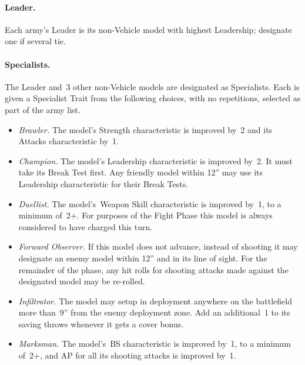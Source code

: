 
  \paragraph{Leader.} Each army's Leader is its non-Vehicle model with
  highest Leadership; designate one if several tie.

  \paragraph{Specialists.}  The Leader and~3 other non-Vehicle models
  are designated as Specialists.  Each is given a Specialist Trait
  from the following choices, with no repetitions, selected as part of
  the army list.

  \begin{itemize}\shortlist
  \item \emph{Brawler.} The model's Strength characteristic is
    improved by~2 and its Attacks characteristic by~1.

  \item \emph{Champion.} The model's Leadership characteristic is
    improved by~2.  It must take its Break Test first.  Any friendly
    model within 12'' may use its Leadership characteristic for their
    Break Tests.
    
  \item \emph{Duellist.} The model's~Weapon Skill characteristic is
    improved by~1, to a minimum of~2+.  For purposes of the Fight
    Phase this model is always considered to have charged this turn.

  \item \emph{Forward Observer.}  If this model does not advance,
    instead of shooting it may designate an enemy model within 12''
    and in its line of sight.  For the remainder of the phase, any hit
    rolls for shooting attacks made against the designated model may
    be re-rolled.

  \item \emph{Infiltrator.} The model may setup in deployment anywhere
    on the battlefield more than~9'' from the enemy deployment zone.
    Add an additional~1 to its saving throws whenever it gets a cover
    bonus.

    
  \item \emph{Marksman.} The model's~BS characteristic is improved
    by~1, to a minimum of~2+, and AP for all its shooting attacks is
    improved by~1.
    

\end{itemize}
